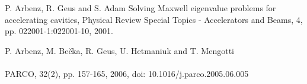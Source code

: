 \begin{thebibliography}{10}

P. Arbenz, R. Geus and S. Adam
{Solving Maxwell eigenvalue problems for accelerating cavities,
Physical Review Special Topics - Accelerators and Beams,
4, pp. 022001-1:022001-10, 2001.}

P. Arbenz, M. Be\v{c}ka, R. Geus, U. Hetmaniuk and T. Mengotti\\
\\
PARCO, 32(2), pp. 157-165, 2006, doi: 10.1016/j.parco.2005.06.005
 
\end{thebibliography}
